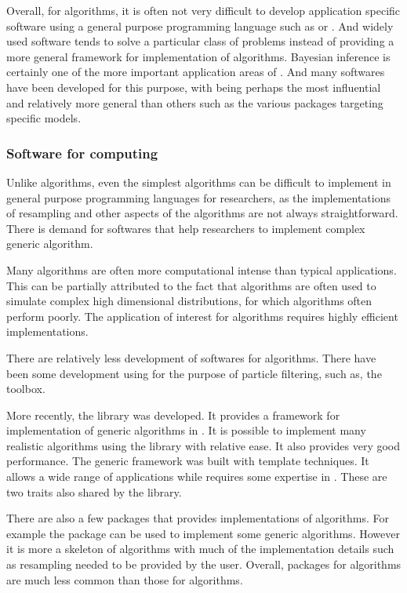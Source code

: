 Overall, for \mcmc algorithms, it is often not very difficult to develop application specific software using a general purpose programming language such as \rlang or \cpp. And widely used software tends to solve a particular class of problems instead of providing a more general framework for implementation of algorithms. Bayesian inference is certainly one of the more important application areas of \mcmc. And many softwares have been developed for this purpose, with \bugs being perhaps the most influential and relatively more general than others such as the various \rlang packages targeting specific models.

\subsubsection{Software for \protect\smc computing}
\label{ssub:Softwares for smc computing}

Unlike \mcmc algorithms, even the simplest \smc algorithms can be difficult to implement in general purpose programming languages for researchers, as the implementations of resampling and other aspects of the algorithms are not always straightforward. There is demand for softwares that help researchers to implement complex generic \smc algorithm.

Many \smc algorithms are often more computational intense than typical \mcmc applications. This can be partially attributed to the fact that \smc algorithms are often used to simulate complex high dimensional distributions, for which \mcmc algorithms often perform poorly. The application of interest for \smc algorithms requires highly efficient implementations.

There are relatively less development of softwares for \smc algorithms. There have been some development using \matlab for the purpose of particle filtering, such as, the \pflib \cite{pflib} toolbox.

More recently, the \smctc library \cite{smctc} was developed. It provides a framework for implementation of generic \smc algorithms in \cpp. It is possible to implement many realistic algorithms using the library with relative ease. It also provides very good performance. The generic framework was built with \cpp template techniques. It allows a wide range of applications while requires some expertise in \cpp. These are two traits also shared by the \vsmc library.

There are also a few \rlang packages that provides implementations of \smc algorithms. For example the \rsmc \cite{rsmc} package can be used to implement some generic \smc algorithms. However it is more a skeleton of \smc algorithms with much of the implementation details such as resampling needed to be provided by the user. Overall, \rlang packages for \smc algorithms are much less common than those for \mcmc algorithms.

